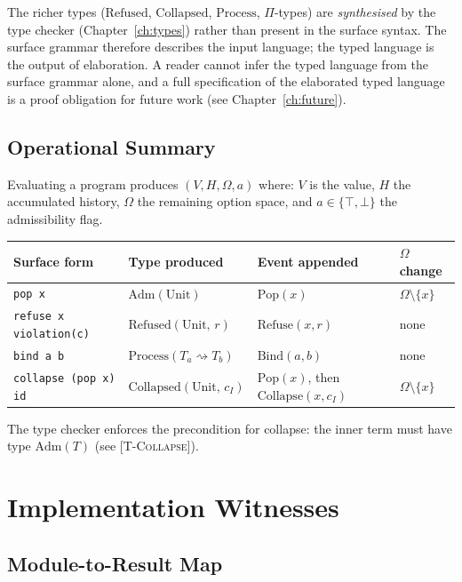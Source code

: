 \documentclass[12pt,oneside,openany]{book}
\theoremstyle{spherepop}
\theoremstyle{remarkstyle}
\newcommand{\Pop}{\mathrm{Pop}}
\newcommand{\Rfuse}{\mathrm{Refuse}}
\newcommand{\Bind}{\mathrm{Bind}}
\newcommand{\Col}{\mathrm{Collapse}}
\newcommand{\Adm}[1]{\mathrm{Adm}(#1)}
\newcommand{\Refused}[2]{\mathrm{Refused}(#1,\,#2)}
\newcommand{\Collapsed}[2]{\mathrm{Collapsed}(#1,\,#2)}
\begin{document}
The richer types ($\mathrm{Refused}$, $\mathrm{Collapsed}$, $\mathrm{Process}$,
$\Pi$-types) are \emph{synthesised} by the type checker (Chapter~\ref{ch:types}) rather
than present in the surface syntax.
The surface grammar therefore describes the input language;
the typed language is the output of elaboration.
A reader cannot infer the typed language from the surface grammar alone,
and a full specification of the elaborated typed language is a proof obligation
for future work (see Chapter~\ref{ch:future}).

\section{Operational Summary}

Evaluating a program produces $(V, H, \Omega, a)$ where:
$V$ is the value, $H$ the accumulated history,
$\Omega$ the remaining option space, and $a \in \{\top, \bot\}$ the
admissibility flag.

\begin{center}
\small\setlength{\tabcolsep}{3pt}\begin{tabular}{p{}p{}p{}p{}}
\toprule
Surface form & Type produced & Event appended & $\Omega$ change \\
\midrule
\texttt{pop x}
  & $\Adm{\mathrm{Unit}}$
  & $\Pop(x)$
  & $\Omega \setminus \{x\}$ \\
\texttt{refuse x violation(c)}
  & $\Refused{\mathrm{Unit}}{r}$
  & $\Rfuse(x, r)$
  & none \\
\texttt{bind a b}
  & $\mathrm{Process}(T_a \rightsquigarrow T_b)$
  & $\Bind(a, b)$
  & none \\
\texttt{collapse (pop x) id}
  & $\Collapsed{\mathrm{Unit}}{c_I}$
  & $\Pop(x)$, then $\Col(x, c_I)$
  & $\Omega \setminus \{x\}$ \\
\bottomrule
\end{tabular}
\end{center}

The type checker enforces the precondition for collapse:
the inner term must have type $\Adm{T}$ (see \textsc{[T-Collapse]}).

\chapter{Implementation Witnesses}
\label{app:witnesses}

\section{Module-to-Result Map}
\end{document}
